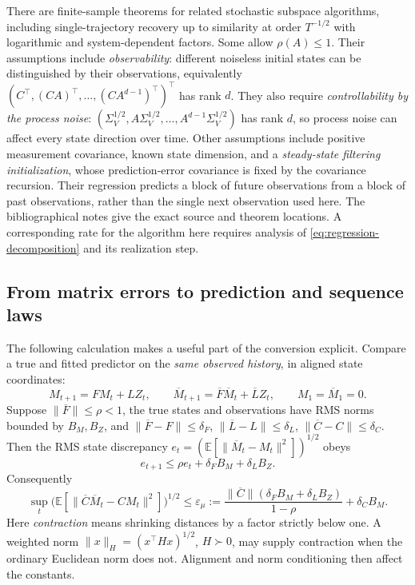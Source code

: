\documentclass[11pt,twoside]{article}
\newcommand{\E}{\mathbb E}
\theoremstyle{definition}
\theoremstyle{remark}
\begin{document}
There are finite-sample theorems for related stochastic subspace
algorithms, including single-trajectory recovery up to similarity at
order \(T^{-1/2}\) with logarithmic and system-dependent factors.
Some allow \(\rho(A)\le1\). Their assumptions include
\emph{observability}: different noiseless initial states can be distinguished
by their observations, equivalently \((C^\top,(CA)^\top,\ldots,(CA^{d-1})^\top)^\top\)
has rank \(d\). They also require \emph{controllability by the process noise}:
\((\Sigma_V^{1/2},A\Sigma_V^{1/2},\ldots,A^{d-1}\Sigma_V^{1/2})\) has rank \(d\),
so process noise can affect every state direction over time.
Other assumptions include positive measurement covariance, known state
dimension, and a \emph{steady-state filtering initialization}, whose
prediction-error covariance is fixed by the covariance recursion.
Their regression predicts a block of future observations from a block
of past observations, rather than the single next observation used here.
The bibliographical notes give the exact source and theorem locations.
A corresponding rate for the algorithm here requires analysis of
\cref{eq:regression-decomposition} and its realization step.

\subsection{From matrix errors to prediction and sequence laws}
\label{sec:metric-conversions}

The following calculation makes a useful part of the conversion explicit.
Compare a true and fitted predictor on the \emph{same observed history},
in aligned state coordinates:
\[
 M_{t+1}=FM_t+LZ_t,\qquad
 \overline M_{t+1}=\overline F\overline M_t+\overline LZ_t,
 \qquad M_1=\overline M_1=0.
\]
Suppose \(\|\overline F\|\le\rho<1\), the true states and observations
have RMS norms bounded by \(B_M,B_Z\), and
\(\|\overline F-F\|\le\delta_F\),
\(\|\overline L-L\|\le\delta_L\),
\(\|\overline C-C\|\le\delta_C\).
Then the RMS state discrepancy
\(e_t=(\E[\|\overline M_t-M_t\|^2])^{1/2}\) obeys
\[
 e_{t+1}\le\rho e_t+\delta_FB_M+\delta_LB_Z.
\]
Consequently
\begin{equation}
 \sup_t\bigl(\E[\|\overline C\overline M_t-CM_t\|^2]\bigr)^{1/2}
 \le \varepsilon_\mu:=
 \frac{\|\overline C\|(\delta_FB_M+\delta_LB_Z)}{1-\rho}
       +\delta_CB_M .
 \label{eq:parameter-to-prediction}
\end{equation}
Here \emph{contraction} means shrinking distances by a factor strictly
below one. A weighted norm \(\|x\|_H=(x^\top Hx)^{1/2}\), \(H\succ0\),
may supply contraction when the ordinary Euclidean norm does not.
Alignment and norm conditioning
then affect the constants.
\end{document}
